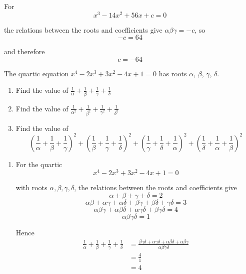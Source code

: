 \documentclass[leqno]{article}
\begin{document}
\begin{enumerate}[
  label=\textbf{\arabic*.},
  leftmargin=*,
  topsep=0pt,
  partopsep=0pt,
  parsep=0pt
]
\begin{djsSolution}
\begin{enumerate}[label=\textbf{(\alph*)}]
For
\[
x^3-14x^2+56x+c=0
\]

the relations between the roots and coefficients give \(\alpha\beta\gamma=-c\), so
\[
-c=64
\]

and therefore
\[
c=-64
\]
\end{enumerate}
\end{djsSolution}


\newpage

\questionitem

The quartic equation $x^4-2x^3+3x^2-4x+1=0$ has roots $\alpha$, $\beta$, $\gamma$, $\delta$. \\

\begin{enumerate}[label=\textbf{(\alph*)}]
  \item Find the value of $\frac{1}{\alpha}+\frac{1}{\beta}+\frac{1}{\gamma}+\frac{1}{\delta}$  \\
  \item Find the value of $\frac{1}{\alpha^2}+\frac{1}{\beta^2}+\frac{1}{\gamma^2}+\frac{1}{\delta^2}$  \\
  \item Find the value of
  \[
  \left(\dfrac{1}{\alpha}+\dfrac{1}{\beta}+\dfrac{1}{\gamma}\right)^2+\left(\dfrac{1}{\beta}+\dfrac{1}{\gamma}+\dfrac{1}{\delta}\right)^2+\left(\dfrac{1}{\gamma}+\dfrac{1}{\delta}+\dfrac{1}{\alpha}\right)^2+\left(\dfrac{1}{\delta}+\dfrac{1}{\alpha}+\dfrac{1}{\beta}\right)^2
  \]
\end{enumerate}

\vspace*{10pt}

\begin{djsSolution}
\begin{enumerate}[label=\textbf{(\alph*)}]
  \item For the quartic
  \[
  x^4-2x^3+3x^2-4x+1=0
  \]

  with roots \(\alpha,\beta,\gamma,\delta\), the relations between the roots and coefficients give
  \[
  \alpha+\beta+\gamma+\delta=2
  \]
  \[
  \alpha\beta+\alpha\gamma+\alpha\delta+\beta\gamma+\beta\delta+\gamma\delta=3
  \]
  \[
  \alpha\beta\gamma+\alpha\beta\delta+\alpha\gamma\delta+\beta\gamma\delta=4
  \]
  \[
  \alpha\beta\gamma\delta=1
  \]

  Hence
  \begin{align*}
  \frac{1}{\alpha}+\frac{1}{\beta}+\frac{1}{\gamma}+\frac{1}{\delta}
  &=\frac{\beta\gamma\delta+\alpha\gamma\delta+\alpha\beta\delta+\alpha\beta\gamma}{\alpha\beta\gamma\delta}\\
  &=\frac{4}{1}\\
  &=4
  \end{align*}


\end{enumerate}
\end{djsSolution}
\end{enumerate}
\end{document}
